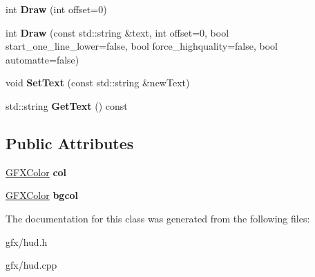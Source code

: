 \begin{DoxyCompactItemize}
\item 
int {\bfseries Draw} (int offset=0)\hypertarget{classTextPlane_af76731b68372c84385a7477d8960e610}{}\label{classTextPlane_af76731b68372c84385a7477d8960e610}

\item 
int {\bfseries Draw} (const std\+::string \&text, int offset=0, bool start\+\_\+one\+\_\+line\+\_\+lower=false, bool force\+\_\+highquality=false, bool automatte=false)\hypertarget{classTextPlane_a0f1fa8bc2a8e141206249c7d8a2090f1}{}\label{classTextPlane_a0f1fa8bc2a8e141206249c7d8a2090f1}

\item 
void {\bfseries Set\+Text} (const std\+::string \&new\+Text)\hypertarget{classTextPlane_a70163cf1623a8338109c9c6193a74c78}{}\label{classTextPlane_a70163cf1623a8338109c9c6193a74c78}

\item 
std\+::string {\bfseries Get\+Text} () const \hypertarget{classTextPlane_a1083dd752d62a2cf185ceee6c73267be}{}\label{classTextPlane_a1083dd752d62a2cf185ceee6c73267be}

\end{DoxyCompactItemize}
\subsection*{Public Attributes}
\begin{DoxyCompactItemize}
\item 
\hyperlink{structGFXColor}{G\+F\+X\+Color} {\bfseries col}\hypertarget{classTextPlane_a7d8c60a585d1c523c08325e90fe1dce6}{}\label{classTextPlane_a7d8c60a585d1c523c08325e90fe1dce6}

\item 
\hyperlink{structGFXColor}{G\+F\+X\+Color} {\bfseries bgcol}\hypertarget{classTextPlane_a184ddb12de7164aa864daa8e03ab2fc5}{}\label{classTextPlane_a184ddb12de7164aa864daa8e03ab2fc5}

\end{DoxyCompactItemize}


The documentation for this class was generated from the following files\+:\begin{DoxyCompactItemize}
\item 
gfx/hud.\+h\item 
gfx/hud.\+cpp\end{DoxyCompactItemize}
